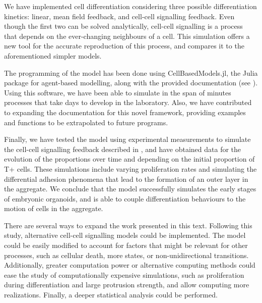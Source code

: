 We have implemented cell differentiation considering three possible differentiation kinetics: linear, mean field feedback, and cell-cell signalling feedback. Even though the first two can be solved analytically, cell-cell signalling is a process that depends on the ever-changing neighbours of a cell. This simulation offers a new tool for the accurate reproduction of this process, and compares it to the aforementioned simpler models.

The programming of the model has been done using CellBasedModels.jl, the Julia package for agent-based modelling, along with the provided documentation 
(see \cite{Torregrosa_2025}). Using this software, we have been able to simulate in the span of minutes processes that take days to develop in the laboratory. Also, we have contributed to expanding the documentation for this novel framework, providing examples and functions to be extrapolated to future programs.

Finally, we have tested the model using experimental measurements to simulate the cell-cell signalling feedback described in \cite{Oriola_2025}, and have obtained data for the evolution of the proportions over time and depending on the initial proportion of T+ cells. These simulations include varying proliferation rates and simulating the differential adhesion phenomena that lead to the formation of an outer layer in the aggregate. We conclude that the model successfully simulates the early stages of embryonic organoids, and is able to couple differentiation behaviours to the motion of cells in the aggregate.

There are several ways to expand the work presented in this text. Following this study, alternative cell-cell signalling models could be implemented. The model could be easily modified to account for factors that might be relevant for other processes, such as cellular death, more states, or non-unidirectional transitions. Additionally, greater computation power or alternative computing methods could ease the study of computationally expensive simulations, such as proliferation during differentiation and large protrusion strength, and allow computing more realizations. Finally, a deeper statistical analysis could be performed.
